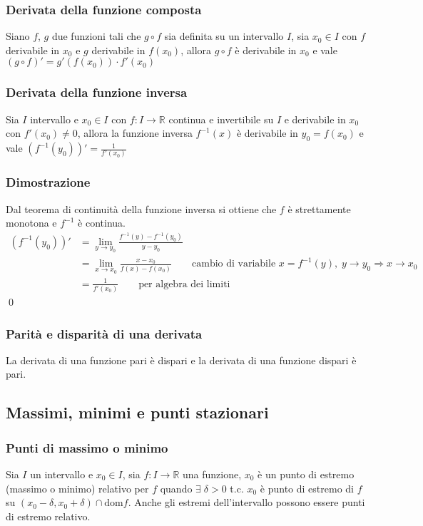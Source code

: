 \documentclass[a4paper]{article}
\newcommand\dom{\text{dom}}
\begin{document}
\subsubsection*{Derivata della funzione composta}
Siano \(f\), \(g\) due funzioni tali che \(g \circ f\) sia definita su un intervallo \(I\), sia \(x_0 \in I\) con \(f\) derivabile in \(x_0\)
e \(g\) derivabile in \(f(x_0)\), allora \(g \circ f\) è derivabile in \(x_0\) e vale \(\left(g \circ f\right)' = g'(f(x_0)) \cdot f'(x_0)\)

\subsubsection*{Derivata della funzione inversa}
Sia \(I\) intervallo e \(x_0 \in I\) con \(f:I \to \mathbb{R}\) continua e invertibile su \(I\) e derivabile in \(x_0\) con \(f'(x_0) \neq 0\),
allora la funzione inversa \(f^{-1}(x)\) è derivabile in \(y_0 = f(x_0)\) e vale \(\displaystyle \left(f^{-1}(y_0)\right)' = \frac{1}{f'(x_0)}\)

\subsubsection*{Dimostrazione}
Dal teorema di continuità della funzione inversa si ottiene che \(f\) è strettamente monotona e \(f^{-1}\) è continua.
\begin{align*}
	\left(f^{-1}(y_0)\right)' &= \lim_{y \to y_0} \frac{f^{-1}(y) - f^{-1}(y_0)}{y - y_0} \\
	&= \lim_{x \to x_0} \frac{x - x_0}{f(x) - f(x_0)} \qquad \text{cambio di variabile } x = f^{-1}(y), \; y \to y_0 \Rightarrow x \to x_0 \\
	&= \frac{1}{f'(x_0)} \qquad \text{per algebra dei limiti}
\end{align*} \qed

\subsubsection*{Parità e disparità di una derivata}
La derivata di una funzione pari è dispari e la derivata di una funzione dispari è pari.

\subsection{Massimi, minimi e punti stazionari}
\subsubsection*{Punti di massimo o minimo}
Sia \(I\) un intervallo e \(x_0 \in I\), sia \(f:I \to \mathbb{R}\) una funzione, \(x_0\) è un punto di estremo (massimo o minimo) relativo
per \(f\) quando \(\exists \; \delta > 0\) t.c. \(x_0\) è punto di estremo di \(f\) su \(\left(x_0 - \delta, x_0 + \delta\right) \cap \dom f\).
Anche gli estremi dell'intervallo possono essere punti di estremo relativo.
\end{document}
